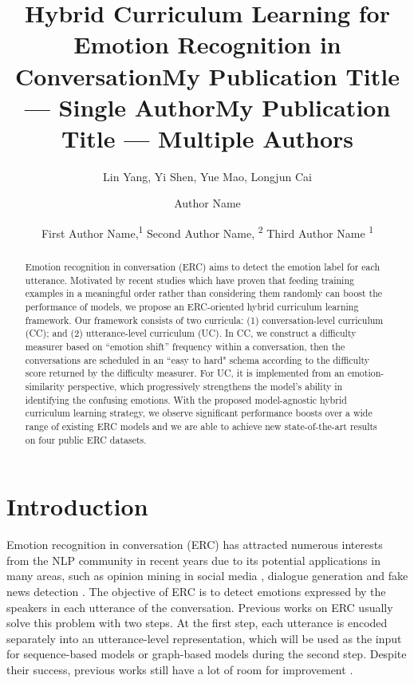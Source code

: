 \documentclass[letterpaper]{article} \usepackage{aaai22}  \usepackage{times}  \usepackage{helvet}  \usepackage{courier}  \usepackage[hyphens]{url}  \usepackage{graphicx} \urlstyle{rm} \def\UrlFont{\rm}  \usepackage{natbib}  \usepackage{caption} \DeclareCaptionStyle{ruled}{labelfont=normalfont,labelsep=colon,strut=off} \frenchspacing  \setlength{\pdfpagewidth}{8.5in}  \setlength{\pdfpageheight}{11in}
\title{Hybrid Curriculum Learning for Emotion Recognition in Conversation}
\author{
Lin Yang\equalcontrib, Yi Shen\equalcontrib, Yue Mao, Longjun Cai
}
\title{My Publication Title --- Single Author}
\author {
    Author Name
}
\title{My Publication Title --- Multiple Authors}
\author {
First Author Name,\textsuperscript{\rm 1}
    Second Author Name, \textsuperscript{\rm 2}
    Third Author Name \textsuperscript{\rm 1}
}
\begin{document}
\maketitle

\begin{abstract}

Emotion recognition in conversation (ERC) aims to detect the emotion label for each utterance. 
Motivated by recent studies which have proven that feeding training examples in a meaningful order rather than considering them randomly can boost the performance of models, we propose an ERC-oriented hybrid curriculum learning framework. Our framework consists of two curricula: (1) conversation-level curriculum (CC); and (2) utterance-level curriculum (UC). In CC, we construct a difficulty measurer based on ``emotion shift'' frequency within a conversation, then the conversations are scheduled in an ``easy to hard" schema according to the difficulty score returned by the difficulty measurer. For UC, it is implemented from an emotion-similarity perspective, which progressively strengthens the model’s ability in identifying the confusing emotions. With the proposed model-agnostic hybrid curriculum learning strategy, we observe significant performance boosts over a wide range of existing ERC models and we are able to achieve new state-of-the-art results on four public ERC datasets.


\end{abstract}

\section{Introduction}

Emotion recognition in conversation (ERC) has attracted numerous interests from the NLP community  in recent years due to its potential applications in many areas, such as opinion mining in social media \cite{chatterjee2019semeval}, dialogue generation \cite{huang2018automatic} and fake news detection \cite{guo2019dean}. The objective of ERC is to detect emotions expressed by the speakers in each utterance of the conversation. Previous works on ERC usually solve this problem with two steps. At the first step, each utterance is encoded separately into an utterance-level representation, which will be used as the input for sequence-based models \citep{majumder2019dialoguernn,hazarika2018icon,jiao2019higru} or graph-based models \citep{ghosal2019dialoguegcn,ishiwatari2020relation} during the second step. Despite their success, previous works still have a lot of room for improvement \cite{poria2019emotion}. 
\end{document}
